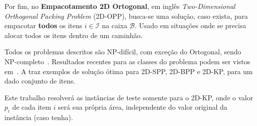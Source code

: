Por fim, no \textbf{Empacotamento 2D Ortogonal}, em inglês \textit{Two-Dimensional Orthogonal
Packing Problem} (2D-OPP), busca-se uma solução, caso exista, para empacotar \textbf{todos} os
itens $i \in \mathcal{I}$ na caixa $\mathcal{B}$.
Usado em situações onde se precisa alocar todos os itens dentro de um caminhão.

Todos os problemas descritos são NP-difícil, com exceção do Ortogonal, sendo NP-completo~\cite{2DPackLib}.
Resultados recentes para as classes do problema podem ser vistos em~\cite{
    cote2014combinatorial,delorme2017logic,velasco2019improved,martin2020models,mrad2015arc,
    cintra2008algorithms,furini2016modeling}.
A  traz exemplos de solução ótima para 2D-SPP, 2D-BPP e 2D-KP,
para um dado conjunto de itens.



Este trabalho resolverá as instâncias de teste somente para o 2D-KP, onde o valor $p_i$ de cada
item $i$ será sua própria área, independente do valor original da instância (caso tenha).
